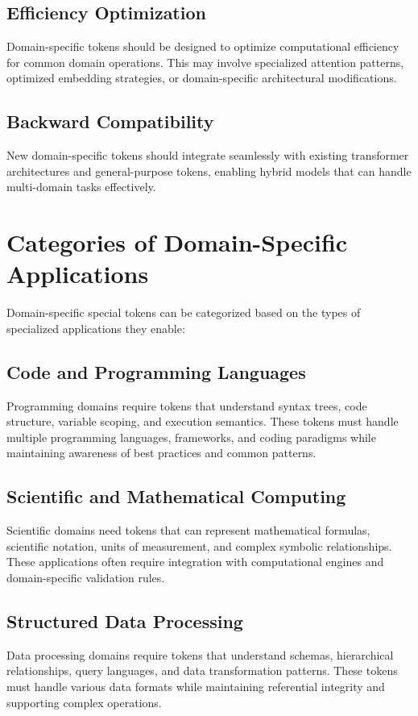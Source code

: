 \subsection{Efficiency Optimization}
Domain-specific tokens should be designed to optimize computational efficiency for common domain operations. This may involve specialized attention patterns, optimized embedding strategies, or domain-specific architectural modifications.

\subsection{Backward Compatibility}
New domain-specific tokens should integrate seamlessly with existing transformer architectures and general-purpose tokens, enabling hybrid models that can handle multi-domain tasks effectively.

\section{Categories of Domain-Specific Applications}

Domain-specific special tokens can be categorized based on the types of specialized applications they enable:

\subsection{Code and Programming Languages}
Programming domains require tokens that understand syntax trees, code structure, variable scoping, and execution semantics. These tokens must handle multiple programming languages, frameworks, and coding paradigms while maintaining awareness of best practices and common patterns.

\subsection{Scientific and Mathematical Computing}
Scientific domains need tokens that can represent mathematical formulas, scientific notation, units of measurement, and complex symbolic relationships. These applications often require integration with computational engines and domain-specific validation rules.

\subsection{Structured Data Processing}
Data processing domains require tokens that understand schemas, hierarchical relationships, query languages, and data transformation patterns. These tokens must handle various data formats while maintaining referential integrity and supporting complex operations.

